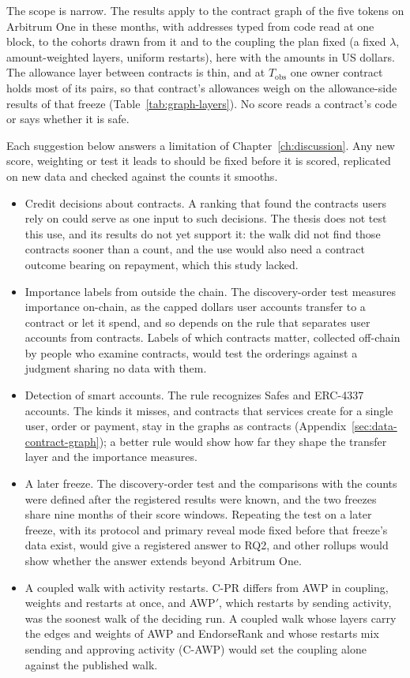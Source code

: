 The scope is narrow. The results apply to the contract graph of the five tokens on Arbitrum One in these months, with addresses typed from code read at one block, to the cohorts drawn from it and to the coupling the plan fixed (a fixed $\lambda$, amount-weighted layers, uniform restarts), here with the amounts in US dollars. The allowance layer between contracts is thin, and at $T_{\mathrm{obs}}$ one owner contract holds most of its pairs, so that contract's allowances weigh on the allowance-side results of that freeze (Table~\ref{tab:graph-layers}). No score reads a contract's code or says whether it is safe.


Each suggestion below answers a limitation of Chapter~\ref{ch:discussion}. Any new score, weighting or test it leads to should be fixed before it is scored, replicated on new data and checked against the counts it smooths.

\begin{itemize}
\item Credit decisions about contracts. A ranking that found the contracts users rely on could serve as one input to such decisions. The thesis does not test this use, and its results do not yet support it: the walk did not find those contracts sooner than a count, and the use would also need a contract outcome bearing on repayment, which this study lacked.
\item Importance labels from outside the chain. The discovery-order test measures importance on-chain, as the capped dollars user accounts transfer to a contract or let it spend, and so depends on the rule that separates user accounts from contracts. Labels of which contracts matter, collected off-chain by people who examine contracts, would test the orderings against a judgment sharing no data with them.
\item Detection of smart accounts. The rule recognizes Safes and ERC-4337 accounts. The kinds it misses, and contracts that services create for a single user, order or payment, stay in the graphs as contracts (Appendix~\ref{sec:data-contract-graph}); a better rule would show how far they shape the transfer layer and the importance measures.
\item A later freeze. The discovery-order test and the comparisons with the counts were defined after the registered results were known, and the two freezes share nine months of their score windows. Repeating the test on a later freeze, with its protocol and primary reveal mode fixed before that freeze's data exist, would give a registered answer to RQ2, and other rollups would show whether the answer extends beyond Arbitrum One.
\item A coupled walk with activity restarts. \mbox{C-PR} differs from AWP in coupling, weights and restarts at once, and AWP$'$, which restarts by sending activity, was the soonest walk of the deciding run. A coupled walk whose layers carry the edges and weights of AWP and EndorseRank and whose restarts mix sending and approving activity (C-AWP) would set the coupling alone against the published walk.
\end{itemize}


